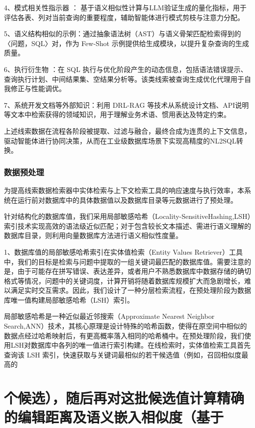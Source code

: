 \documentclass[12pt,a4paper,openright,UTF8]{ctexbook}
\begin{document}
4、模式相关性指示器 ： 基于语义相似性计算与LLM验证生成的量化指标，用于评估各表、列对当前查询的重要程度，辅助智能体进行模式剪枝与注意力分配。


5、语义结构相似的示例：通过抽象语法树（AST）与语义骨架匹配检索得到的〈问题，SQL〉对，作为 Few-Shot 示例提供给生成模块，以提升复杂查询的生成质量。


6、执行衍生物 ：在 SQL 执行与优化阶段产生的动态信息，包括语法错误提示、查询执行计划、中间结果集、空结果分析等。该类线索被查询生成优化代理用于自我修正与性能调优。


7、系统开发文档等外部知识：利用 DRL-RAG 等技术从系统设计文档、API说明等文本中检索获得的领域知识，用于理解业务术语、惯用表达及特定约束。


上述线索数据在流程各阶段被提取、过滤与融合，最终合成为连贯的上下文信息，驱动智能体进行协同决策，从而在工业级数据库场景下实现高精度的NL2SQL转换。

\subsection{数据预处理}

为提高线索数据检索器中实体检索与上下文检索工具的响应速度与执行效率，本系统在运行前对数据库中的具体数据值以及数据库目录等元数据进行了预处理。


针对结构化的数据库值，我们采用局部敏感哈希（Locality-SensitiveHashing,LSH）索引技术实现高效的语法级近似匹配；对于包含较长文本描述、需进行语义理解的数据库目录，则利用向量数据库方法进行语义相似性度量。


1、数据库值的局部敏感哈希索引在实体值检索（Entity Values Retriever）工具中，我们的目标是检索与问题中提取的一组关键词最匹配的数据库值。需要注意的是，由于可能存在拼写错误、表达差异，或者用户不熟悉数据库中数据存储的确切格式等情况，问题中的关键词度，计算开销将随着数据库规模扩大而急剧增长，难以满足实时交互需求。因此，我们设计了一种分层检索流程，在预处理阶段为数据库唯一值构建局部敏感哈希（LSH）索引。


局部敏感哈希是一种近似最近邻搜索（Approximate Nearest Neighbor Search,ANN）技术，其核心原理是设计特殊的哈希函数，使得在原空间中相似的数据点经过哈希映射后，有更高概率落入相同的哈希桶中。在预处理阶段，我们使用LSH对数据库中各列的唯一值进行索引构建。在线检索时，实体值检索工具首先查询该 LSH 索引，快速获取与关键词最相似的若干候选值（例如，召回相似度最高的

\chapter{个候选），随后再对这批候选值计算精确的编辑距离及语义嵌入相似度（基于}
\end{document}
